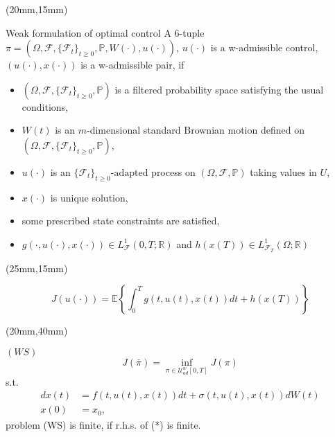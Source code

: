 \begin{frame}[plain]
	\begin{textblock*}{90mm}(20mm,15mm)
		\begin{graybox}{Weak formulation of optimal control}
			 A 6-tuple $\pi=(\Omega,\mathscr{F},\{\mathscr{F}_t\}_{t\geq 0},\mathbb{P},W(\cdot),u(\cdot))$, $u(\cdot)$ is  a w-admissible control, $(u(\cdot),x(\cdot))$ is a w-admissible pair, if
			\begin{itemize}[<+->]
				\item $(\Omega,\mathscr{F},\{\mathscr{F}_t\}_{t\geq 0},\mathbb{P})$ is a filtered probability space satisfying the usual conditions,
				\item $W(t)$ is an $m$-dimensional standard Brownian motion defined on $(\Omega,\mathscr{F},\{\mathscr{F}_t\}_{t\geq 0},\mathbb{P})$,
				\item $u(\cdot)$ is an $\{\mathscr{F}_t\}_{t\geq 0}\text{-adapted}$ process on $(\Omega,\mathscr{F},\mathbb{P})$ taking values in $U$,
				\item $x(\cdot)$ is unique solution,
				\item some prescribed state constraints are satisfied,
				\item $g(\cdot,u(\cdot),x(\cdot))\in L^1_{\mathscr{F}}(0,T;\mathbb{R})$ and $h(x(T))\in L^1_{\mathscr{F}_T}(\Omega;\mathbb{R})$
			\end{itemize}
		\end{graybox}
	\end{textblock*}
\end{frame}
\begin{frame}[plain]
		\begin{textblock*}{80mm}(25mm,15mm)
		\begin{yellowbox}{}
			\begin{equation*}
				J(u(\cdot))= \mathbb{E}\left\{\int_{0}^{T}g(t,u(t),x(t))dt+h(x(T))\right\}
			\end{equation*}
		\end{yellowbox}
	\end{textblock*}
	
	
	\begin{textblock*}{90mm}(20mm,40mm)
		\begin{graybox}{$(WS)$}
				\begin{equation*}
					J(\bar{\pi})=\inf_{\pi\in \mathcal{U}^w_{ad}[0,T]} J(\pi)
					\tag{*}
				\end{equation*}
				s.t.
				\begin{align*}
					dx(t)&=
					f(t,u(t),x(t))dt+\sigma(t,u(t),x(t))dW(t)\\
					x(0)&=
					x_0,
				\end{align*}
				\tcblower
					problem (WS) is finite, if r.h.s. of (*) is finite. 
			\end{graybox}
	\end{textblock*}
\end{frame}
